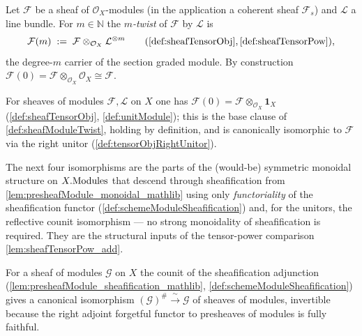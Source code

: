 \begin{definition}
  \label{def:sheafModuleTwist}
  Let \(\mathcal{F}\) be a sheaf of \(\mathcal{O}_X\)-modules (in the application
  a coherent sheaf \(\mathcal{F}_s\)) and \(\mathcal{L}\) a line bundle. For
  \(m \in \mathbb{N}\) the \emph{\(m\)-twist} of \(\mathcal{F}\) by
  \(\mathcal{L}\) is
  \[
    \mathcal{F}(m) \;:=\;
      \mathcal{F} \otimes_{\mathcal{O}_X} \mathcal{L}^{\otimes m}
      \qquad(\cref{def:sheafTensorObj}, \cref{def:sheafTensorPow}),
  \]
  the degree-\(m\) carrier of the section graded module. By construction
  \(\mathcal{F}(0) = \mathcal{F} \otimes_{\mathcal{O}_X} \mathcal{O}_X \cong
  \mathcal{F}\).
\end{definition}

\begin{lemma}
  \label{lem:moduleTensorPow_zero}
  For sheaves of modules \(\mathcal{F}, \mathcal{L}\) on \(X\) one has
  \(\mathcal{F}(0) = \mathcal{F} \otimes_{\mathcal{O}_X} \mathbf{1}_X\)
  (\cref{def:sheafTensorObj}, \cref{def:unitModule}); this is the base clause of
  \cref{def:sheafModuleTwist}, holding by definition, and is canonically
  isomorphic to \(\mathcal{F}\) via the right unitor
  (\cref{def:tensorObjRightUnitor}).
\end{lemma}

The next four isomorphisms are the parts of the (would-be) symmetric monoidal
structure on \(X.\mathrm{Modules}\) that descend through sheafification from
\cref{lem:presheafModule_monoidal_mathlib} using only \emph{functoriality} of the
sheafification functor (\cref{def:schemeModuleSheafification}) and, for the
unitors, the reflective counit isomorphism --- no strong monoidality of
sheafification is required. They are the structural inputs of the tensor-power
comparison \cref{lem:sheafTensorPow_add}.

\begin{definition}
  \label{def:sheafificationCounitIso}
  For a sheaf of modules \(\mathcal{G}\) on \(X\) the counit of the sheafification
  adjunction (\cref{lem:presheafModule_sheafification_mathlib},
  \cref{def:schemeModuleSheafification}) gives a canonical isomorphism
  \((\mathcal{G})^{\#} \xrightarrow{\ \sim\ } \mathcal{G}\) of sheaves of modules,
  invertible because the right adjoint forgetful functor to presheaves of modules
  is fully faithful.
\end{definition}

